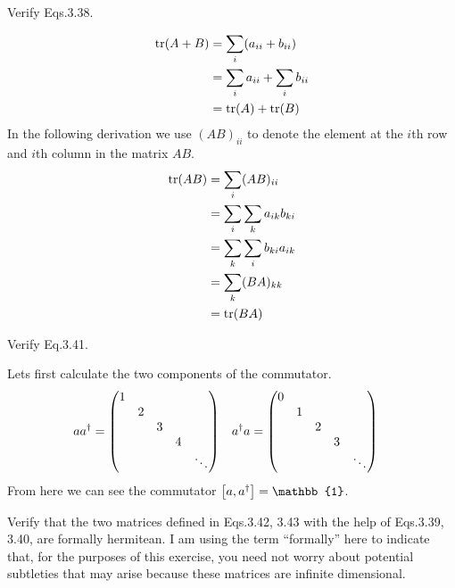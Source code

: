 \documentclass[boxes,pages]{homework}
\makeatletter
\numberwithin{@problem}{section}
\makeatother
\begin{document}
\begin{problem}
Verify Eqs.3.38.
\end{problem}

\begin{solution}
	\begin{align*}
		\tr(A + B) & = \sum_i(a_{ii} + b_{ii})       \\
		           & = \sum_i a_{ii} + \sum_i b_{ii} \\
		           & = \tr(A) + \tr(B)
	\end{align*}
	In the following derivation we use $(AB)_{ii}$ to denote the element at the $i$th row and $i$th column in the matrix $AB$.
	\begin{align*}
		\tr(AB) & = \sum_i(AB)_{ii}           \\
		        & =\sum_i\sum_k a_{ik}b_{ki}  \\
		        & = \sum_k\sum_i b_{ki}a_{ik} \\
		        & = \sum_k(BA)_{kk}           \\
		        & = \tr(BA)
	\end{align*}
\end{solution}

\begin{problem}
Verify Eq.3.41.
\end{problem}

\begin{solution}
	Lets first calculate the two components of the commutator.
	\begin{align*}
		aa^\dagger & = \mqty(\dmat{1,2,3,4,\ddots}) & a^\dagger a & = \mqty(\dmat{0,1,2,3,\ddots})
	\end{align*}
	From here we can see the commutator $\comm{a}{a^\dagger} = \mathbb{1}$.
\end{solution}

\begin{problem}
Verify that the two matrices defined in Eqs.3.42, 3.43 with the help of Eqs.3.39, 3.40, are formally hermitean. I am using the term ``formally'' here to indicate that, for the purposes of this exercise, you need not worry about potential subtleties that may arise because these matrices are infinite dimensional.
\end{problem}
\end{document}
